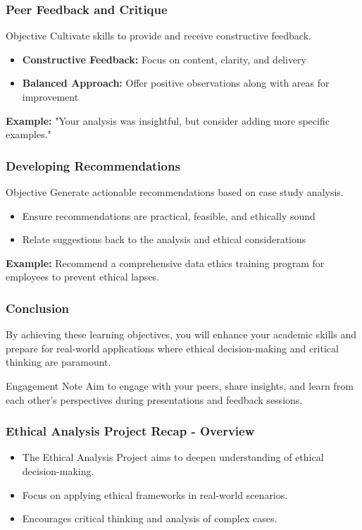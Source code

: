 \documentclass[aspectratio=169]{beamer}
\begin{document}
\begin{frame}[fragile]
    \frametitle{Peer Feedback and Critique}
    \begin{block}{Objective}
        Cultivate skills to provide and receive constructive feedback.
    \end{block}
    \begin{itemize}
        \item \textbf{Constructive Feedback:} Focus on content, clarity, and delivery
        \item \textbf{Balanced Approach:} Offer positive observations along with areas for improvement
    \end{itemize}
    \textbf{Example:} "Your analysis was insightful, but consider adding more specific examples."
\end{frame}

\begin{frame}[fragile]
    \frametitle{Developing Recommendations}
    \begin{block}{Objective}
        Generate actionable recommendations based on case study analysis.
    \end{block}
    \begin{itemize}
        \item Ensure recommendations are practical, feasible, and ethically sound
        \item Relate suggestions back to the analysis and ethical considerations
    \end{itemize}
    \textbf{Example:} Recommend a comprehensive data ethics training program for employees to prevent ethical lapses.
\end{frame}

\begin{frame}[fragile]
    \frametitle{Conclusion}
    By achieving these learning objectives, you will enhance your academic skills and prepare for real-world applications where ethical decision-making and critical thinking are paramount. 
    \begin{block}{Engagement Note}
        Aim to engage with your peers, share insights, and learn from each other's perspectives during presentations and feedback sessions.
    \end{block}
\end{frame}

\begin{frame}[fragile]
    \frametitle{Ethical Analysis Project Recap - Overview}
    \begin{itemize}
        \item The Ethical Analysis Project aims to deepen understanding of ethical decision-making.
        \item Focus on applying ethical frameworks in real-world scenarios.
        \item Encourages critical thinking and analysis of complex cases.
    \end{itemize}
\end{frame}
\end{document}
